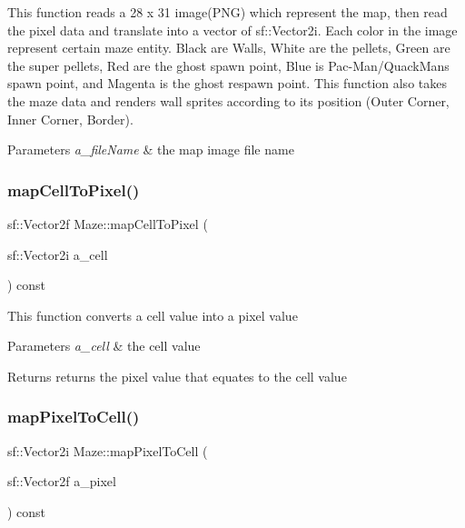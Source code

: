 This function reads a 28 x 31 image(\+P\+N\+G) which represent the map, then read the pixel data and translate into a vector of sf\+::\+Vector2i. Each color in the image represent certain maze entity. Black are Walls, White are the pellets, Green are the super pellets, Red are the ghost spawn point, Blue is Pac-\/\+Man/\+Quack\+Man\textquotesingle{}s spawn point, and Magenta is the ghost respawn point. This function also takes the maze data and renders wall sprites according to its position (Outer Corner, Inner Corner, Border). 
\begin{DoxyParams}{Parameters}
{\em a\+\_\+file\+Name} & the map image file name \\
\hline
\end{DoxyParams}
\mbox{\label{class_maze_ad1ed938797ff928c0b90cf176d298429}} 
\subsubsection{\texorpdfstring{map\+Cell\+To\+Pixel()}{mapCellToPixel()}}
{\footnotesize\ttfamily sf\+::\+Vector2f Maze\+::map\+Cell\+To\+Pixel (\begin{DoxyParamCaption}\item[{sf\+::\+Vector2i}]{a\+\_\+cell }\end{DoxyParamCaption}) const}

This function converts a cell value into a pixel value


\begin{DoxyParams}{Parameters}
{\em a\+\_\+cell} & the cell value \\
\hline
\end{DoxyParams}
\begin{DoxyReturn}{Returns}
returns the pixel value that equates to the cell value 
\end{DoxyReturn}
\mbox{\label{class_maze_a6e9ed602dba392b5aaf8b694f5aa6197}} 
\subsubsection{\texorpdfstring{map\+Pixel\+To\+Cell()}{mapPixelToCell()}}
{\footnotesize\ttfamily sf\+::\+Vector2i Maze\+::map\+Pixel\+To\+Cell (\begin{DoxyParamCaption}\item[{sf\+::\+Vector2f}]{a\+\_\+pixel }\end{DoxyParamCaption}) const}

